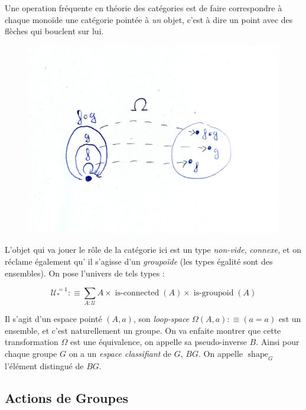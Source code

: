 \documentclass{article}
\let\loop\relax
\DeclareMathOperator{\loop}{loop}
\DeclareMathOperator{\isconnected}{is-connected}
\DeclareMathOperator{\isgroupoid}{is-groupoid}
\DeclareMathOperator{\shape}{shape}
\begin{document}
Une operation fréquente en théorie des catégories est de faire correspondre à chaque monoïde une catégorie pointée à \emph{un} objet, c'est à dire un point avec des flèches qui bouclent sur lui.

\begin{figure}[h]
\centering
\includegraphics[scale=0.03]{omega}
\end{figure}

L'objet qui va jouer le rôle de la catégorie ici est un type \emph{non-vide}, \emph{connexe}, et on réclame également qu' il s'agisse d'un \emph{groupoïde} (les types égalité sont des ensembles). On pose l'univers de tels types :

\[\mathcal{U}_{*}^{=1} :\equiv \displaystyle\sum_{A : \mathcal{U}}A \times \isconnected(A) \times \isgroupoid(A)\]

Il s'agit d'un espace pointé $(A,a)$, son \emph{loop-space} $\Omega(A,a) :\equiv (a = a)$ est un ensemble, et c'est naturellement un groupe. On va enfaite montrer que cette transformation $\Omega$ est une équivalence, on appelle sa pseudo-inverse $B$. Ainsi pour chaque groupe $G$ on a un \emph{espace classifiant} de $G$, $BG$. On appelle $\shape_{G}$ l'élément distingué de $BG$.

\subsection{Actions de Groupes}


\end{document}
